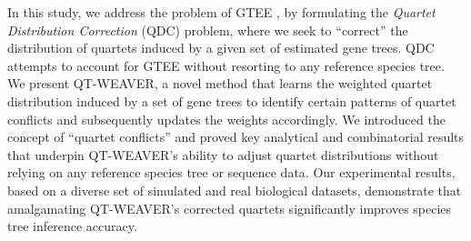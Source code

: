 \documentclass[runningheads]{llncs}
\begin{document}
In this study, we address the problem of GTEE 
, by formulating the \textit{Quartet Distribution Correction} (QDC) problem, where we seek to ``correct'' the distribution of quartets induced by a given set of estimated gene trees. QDC attempts to account for GTEE without resorting to any reference species tree.
We present QT-WEAVER, a novel method that learns the weighted quartet distribution induced by a set of gene trees to identify certain patterns of quartet conflicts and subsequently updates the weights accordingly. We introduced the concept of ``quartet conflicts'' and proved key analytical and combinatorial results that underpin QT-WEAVER's ability to adjust quartet distributions without relying on any reference species tree or sequence data. 
Our experimental results, based on a diverse set of simulated and real biological datasets, demonstrate that amalgamating QT-WEAVER's corrected quartets significantly improves species tree inference accuracy. 

\end{document}
